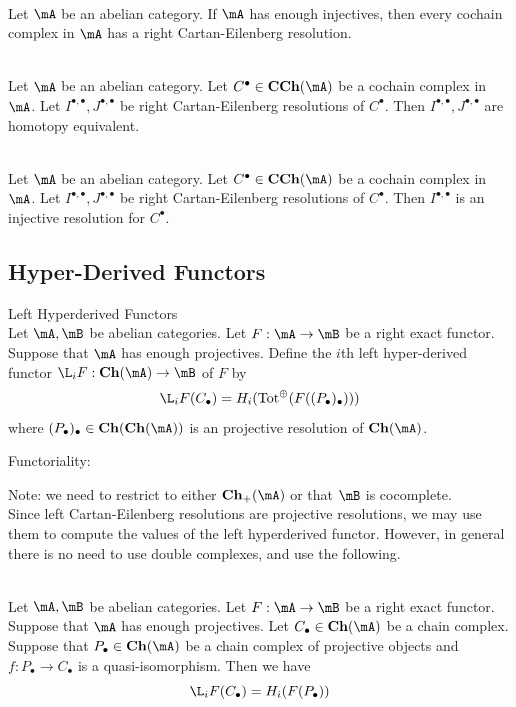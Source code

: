 \documentclass[a4paper]{article}
\begin{document}
\begin{lmm}{}{}\\
Let $\mA$ be an abelian category. If $\mA$ has enough injectives, then every cochain complex in $\mA$ has a right Cartan-Eilenberg resolution. 
\end{lmm}

\begin{lmm}{}{}\\
Let $\mA$ be an abelian category. Let $C^\bullet\in\bold{CCh}(\mA)$ be a cochain complex in $\mA$. Let $I^{\bullet,\bullet},J^{\bullet,\bullet}$ be right Cartan-Eilenberg resolutions of $C^\bullet$. Then $I^{\bullet,\bullet},J^{\bullet,\bullet}$ are homotopy equivalent. 
\end{lmm}

\begin{prp}{}{}\\
Let $\mA$ be an abelian category. Let $C^\bullet\in\bold{CCh}(\mA)$ be a cochain complex in $\mA$. Let $I^{\bullet,\bullet},J^{\bullet,\bullet}$ be right Cartan-Eilenberg resolutions of $C^\bullet$. Then $I^{\bullet,\bullet}$ is an injective resolution for $C^\bullet$. 
\end{prp}

\subsection{Hyper-Derived Functors}
\begin{defn}{Left Hyperderived Functors}{}\\
Let $\mA,\mB$ be abelian categories. Let $F:\mA\to\mB$ be a right exact functor. Suppose that $\mA$ has enough projectives. Define the $i$th left hyper-derived functor $\L_iF:\bold{Ch}(\mA)\to\mB$ of $F$ by $$\L_iF(C_\bullet)=H_i(\text{Tot}^\oplus(F((P_\bullet)_\bullet)))$$ where $(P_\bullet)_\bullet\in\bold{Ch}(\bold{Ch}(\mA))$ is an projective resolution of $\bold{Ch}(\mA)$. 
\end{defn}

Functoriality: 

Note: we need to restrict to either $\bold{Ch}_+(\mA)$ or that $\mB$ is cocomplete. \\

Since left Cartan-Eilenberg resolutions are projective resolutions, we may use them to compute the values of the left hyperderived functor. However, in general there is no need to use double complexes, and use the following. 

\begin{prp}{}{}\\
Let $\mA,\mB$ be abelian categories. Let $F:\mA\to\mB$ be a right exact functor. Suppose that $\mA$ has enough projectives. Let $C_\bullet\in\bold{Ch}(\mA)$ be a chain complex. Suppose that $P_\bullet\in\bold{Ch}(\mA)$ be a chain complex of projective objects and $f:P_\bullet\to C_\bullet$ is a quasi-isomorphism. Then we have $$\L_iF(C_\bullet)=H_i(F(P_\bullet))$$
\end{prp}
\end{document}
